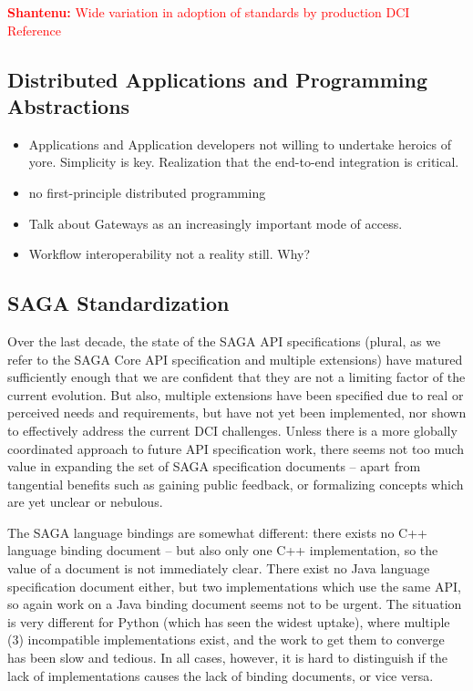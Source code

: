 \documentclass{article}
\newcommand{\B}[1]{\textbf{#1}}
\newcommand{\jhanote}[1]{{\textcolor{red}{     \B{Shantenu:} #1 }}}
\newcommand{\jhanote}[1]{}
\begin{document}
  \jhanote{Wide variation in adoption of standards by production DCI
  Reference~\cite{dpa-pdci-tr}}

   
\subsection{Distributed Applications and Programming Abstractions}

 \begin{itemize}
 \item Applications and Application developers not willing to
   undertake heroics of yore. Simplicity is key. Realization that the
   end-to-end integration is critical.
 \item no first-principle distributed programming
 \item Talk about Gateways as an increasingly important mode of
   access. 
 \item Workflow interoperability not a reality still. Why?
 \end{itemize}

 \subsection{SAGA Standardization}

  Over the last decade, the state of the SAGA API specifications
  (plural, as we refer to the SAGA Core API specification and multiple
  extensions) have matured sufficiently enough that we are confident
  that they are not a limiting factor of the current evolution.  But
  also, multiple extensions have been specified due to real or perceived
  needs and requirements, but have not yet been implemented, nor shown
  to effectively address the current DCI challenges.  Unless there is
  a more globally coordinated approach to future API specification work,
  there seems not too much value in expanding the set of SAGA
  specification documents -- apart from tangential benefits such as
  gaining public feedback, or formalizing concepts which are yet unclear
  or nebulous.

  The SAGA language bindings are somewhat different: there exists no C++
  language binding document -- but also only one C++ implementation, so
  the value of a document is not immediately clear.  There exist no Java
  language specification document either, but two implementations which
  use the same API, so again work on a Java binding document seems not
  to be urgent.  The situation is very different for Python (which has
  seen the widest uptake), where multiple (3) incompatible
  implementations exist, and the work to get them to converge has been
  slow and tedious.  In all cases, however, it is hard to distinguish if
  the lack of implementations causes the lack of binding documents, or
  vice versa.
  
\end{document}
